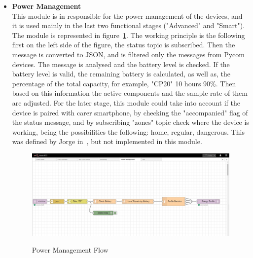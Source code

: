\begin{itemize}
   \item \textbf{Power Management}\\
   This module is in responsible for the power management of the devices, and it is used mainly in the last two functional stages ("Advanced"  and "Smart"). The module is represented in  figure~\ref{fig:Power_Management}. The working principle is the following first on the left side of the figure, the status topic is subscribed. Then the message is converted to JSON, and is filtered only the messages from Pycom devices. The message is analysed and the battery level is checked. If the battery level is valid, the remaining battery is calculated, as well as, the percentage of the total capacity, for example, "CP20" 10 hours 90\%. Then based on this information the active components and the sample rate of them are adjusted. For the later stage, this module could take into account if the device is paired  with carer smartphone, by checking the "accompanied" flag of the status message, and by subscribing "zones" topic check where the device is working, being the possibilities the following: home, regular, dangerous. This was defined by Jorge in~\cite{githuMQTT}, but not implemented in this module.
    \begin{figure}[htbp]
      \centering
      
        {\includegraphics[width=0.9\linewidth]{Chapters/Figures/PowerManagement.JPG}}
     
      \caption{Power Management Flow}
      \label{fig:Power_Management}
    \end{figure}
 
\end{itemize}

